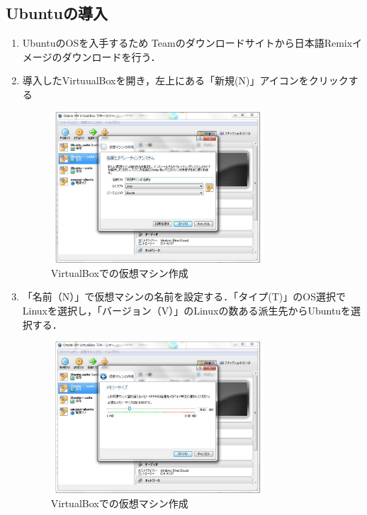 \subsection{Ubuntuの導入}


\begin{enumerate}

 \item 	UbuntuのOSを入手するため %
Teamのダウンロードサイトから日本語Remixイメージのダウンロードを行う．


 \item 	導入したVirtuualBoxを開き，左上にある「新規(N)」アイコンをクリックする

\begin{figure}[htbp]

\centering
\includegraphics[width=8cm,clip]{VirtualBox2.pdf}
\caption{VirtualBoxでの仮想マシン作成}
\label{VirtualBoxinstall2}

\end{figure}

 \item 	「名前（N）」で仮想マシンの名前を設定する．「タイプ(T)」のOS選択でLinuxを選択し，「バージョン（V）」のLinuxの数ある派生先からUbuntuを選択する．

\begin{figure}[htbp]

\centering
\includegraphics[width=8cm,clip]{VirtualBox3.pdf}
\caption{VirtualBoxでの仮想マシン作成}
\label{VirtualBoxinstall3}


\end{figure}
\end{enumerate}

